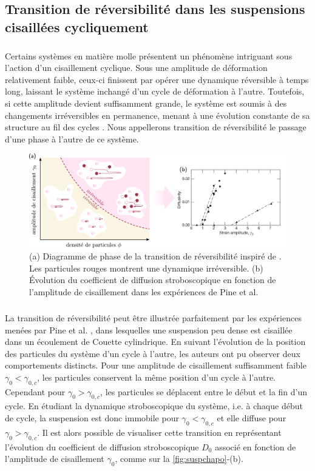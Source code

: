 \subsection{Transition de réversibilité dans les suspensions cisaillées cycliquement}

\subparagraph{}Certains systèmes en matière molle présentent un phénomène intriguant sous l'action d'un cisaillement cyclique. Sous une amplitude de déformation relativement faible, ceux-ci finissent par opérer une dynamique réversible à temps long, laissant le système inchangé d'un cycle de déformation à l'autre. Toutefois, si cette amplitude devient suffisamment grande, le système est soumis à des changements irréversibles en permanence, menant à une évolution constante de sa structure au fil des cycles \cite{eckstein_self_diffusion_1977, breedveld_shear_induced_2001, drazer_microstructure_2004}. Nous appellerons transition de réversibilité le passage d'une phase à l'autre de ce système.

\begin{figure}[h]
	\centering
	\includegraphics[width=\textwidth]{Chapitre1/Figures/Chapo/suspensions.pdf}
	\caption{(a) Diagramme de phase de la transition de réversibilité inspiré de \cite{maegochi_critical_2021}. Les particules rouges montrent une dynamique irréversible. (b) Évolution du coefficient de diffusion stroboscopique en fonction de l'amplitude de cisaillement dans les expériences de Pine et al. \cite{pine_chaos_2005}}
	\label{fig:suspchapo}
\end{figure}

\subparagraph{}La transition de réversibilité peut être illustrée parfaitement par les expériences menées par Pine et al. \cite{pine_chaos_2005}, dans lesquelles une suspension peu dense est cisaillée dans un écoulement de Couette cylindrique. En suivant l'évolution de la position des particules du système d'un cycle à l'autre, les auteurs ont pu observer deux comportements distincts. Pour une amplitude de cisaillement suffisamment faible $\gamma_0 < \gamma_{0,c}$, les particules conservent la même position d'un cycle à l'autre. Cependant pour $\gamma_0 > \gamma_{0,c}$, les particules se déplacent entre le début et la fin d'un cycle. En étudiant la dynamique stroboscopique du système, i.e. à chaque début de cycle, la suspension est donc immobile pour $\gamma_0 < \gamma_{0,c}$ et elle diffuse pour $\gamma_0 > \gamma_{0,c}$. Il est alors possible de visualiser cette transition en représentant l'évolution du coefficient de diffusion stroboscopique $D_0$ associé en fonction de l'amplitude de cisaillement $\gamma_0$, comme sur la \autoref{fig:suspchapo}-(b).

